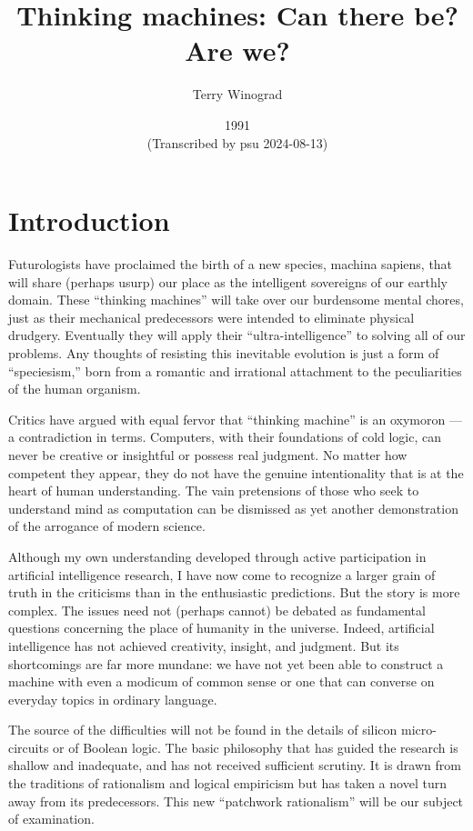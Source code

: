 \documentclass[12pt]{article}
\begin{document}
\title{\Large Thinking machines: Can there be? Are we?}
\author{\large Terry Winograd}
\date{\normalsize 1991 \\ {\footnotesize (Transcribed by psu 2024-08-13)}}

\maketitle

\section{Introduction}

Futurologists have proclaimed the birth of a new species, machina sapiens, that will share (perhaps usurp) our place as the intelligent sovereigns of our earthly domain. These ``thinking machines'' will take over our burdensome mental chores, just as their mechanical predecessors were intended to eliminate physical drudgery. Eventually they will apply their ``ultra-intelligence'' to solving all of our problems. Any thoughts of resisting this inevitable evolution is just a form of ``speciesism,'' born from a romantic and irrational attachment to the peculiarities of the human organism.

Critics have argued with equal fervor that ``thinking machine'' is an oxymoron --- a contradiction in terms. Computers, with their foundations of cold logic, can never be creative or insightful or possess real judgment. No matter how competent they appear, they do not have the genuine intentionality that is at the heart of human understanding. The vain pretensions of those who seek to understand mind as computation can be dismissed as yet another demonstration of the arrogance of modern science.

Although my own understanding developed through active participation in artificial intelligence research, I have now come to recognize a larger grain of truth in the criticisms than in the enthusiastic predictions. But the story is more complex. The issues need not (perhaps cannot) be debated as fundamental questions concerning the place of humanity in the universe. Indeed, artificial intelligence has not achieved creativity, insight, and judgment. But its shortcomings are far more mundane: we have not yet been able to construct a machine with even a modicum of common sense or one that can converse on everyday topics in ordinary language.

The source of the difficulties will not be found in the details of silicon micro-circuits or of Boolean logic. The basic philosophy that has guided the research is shallow and inadequate, and has not received sufficient scrutiny. It is drawn from the traditions of rationalism and logical empiricism but has taken a novel turn away from its predecessors. This new ``patchwork rationalism'' will be our subject of examination.
\end{document}

